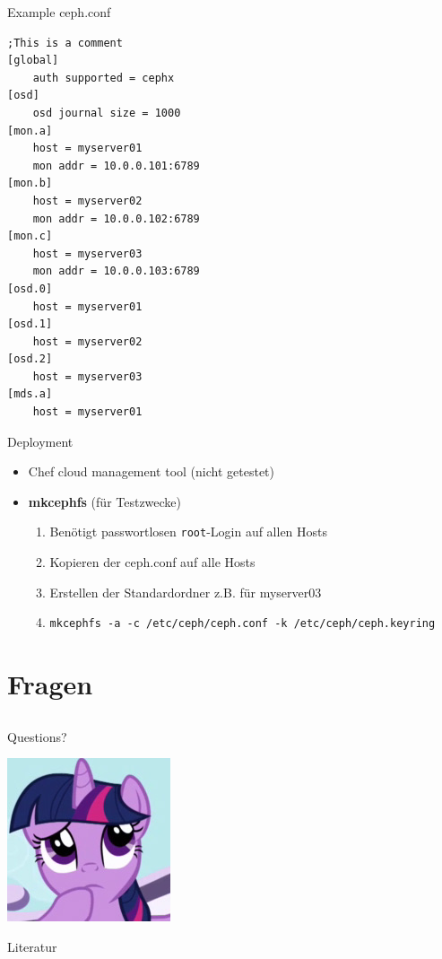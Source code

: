 \documentclass[notes=hide,yellow]{beamer}
\begin{document}
\begin{frame}[fragile]{Example ceph.conf}

\begin{lstlisting}
;This is a comment
[global]
	auth supported = cephx
[osd]
	osd journal size = 1000
[mon.a]
	host = myserver01
	mon addr = 10.0.0.101:6789
[mon.b]
	host = myserver02
	mon addr = 10.0.0.102:6789
[mon.c]
	host = myserver03
	mon addr = 10.0.0.103:6789
[osd.0]
	host = myserver01
[osd.1]
	host = myserver02
[osd.2]
	host = myserver03
[mds.a]
	host = myserver01
\end{lstlisting}
\end{frame}



\begin{frame}{Deployment}
	\begin{itemize}
		\item Chef cloud management tool (nicht getestet)
		\item \textbf{mkcephfs} (f\"ur Testzwecke)
			\begin{enumerate}
				\item Ben\"otigt passwortlosen \texttt{root}-Login auf allen Hosts
				\item Kopieren der ceph.conf auf alle Hosts
				\item Erstellen der Standardordner z.B. f\"ur myserver03
				\item \texttt{mkcephfs -a -c /etc/ceph/ceph.conf -k /etc/ceph/ceph.keyring}
			\end{enumerate}
	\end{itemize}
\end{frame}



\section{Fragen}
\subsection*{}
\begin{frame}
	\begin{center}
	\large Questions?
	\end{center}
	
	\begin{center}
	\includegraphics[scale=0.8]{questions.jpg}
	\end{center}
\end{frame}



\begin{frame}{Literatur}
	
		
\end{frame}
\end{document}
